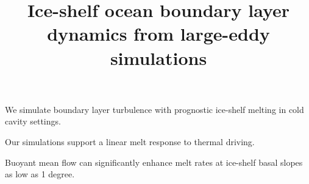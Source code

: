 \documentclass[draft]{styles/agujournal2019}
\begin{document}
\title{Ice-shelf ocean boundary layer dynamics from large-eddy simulations}

	

\begin{keypoints}
\item We simulate boundary layer turbulence with prognostic ice-shelf melting
in cold cavity settings.
\item Our simulations support a linear melt response to thermal driving.
\item Buoyant mean flow can significantly enhance melt rates at ice-shelf basal slopes as low as 1 degree.
\end{keypoints}
\end{document}
